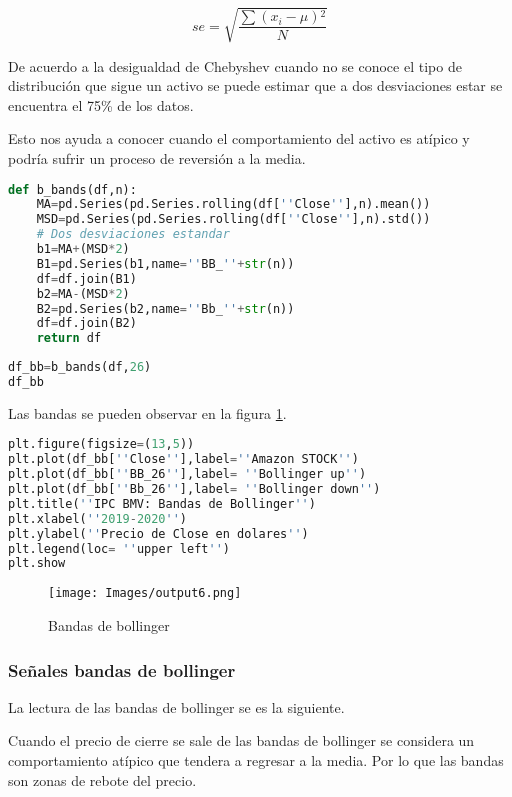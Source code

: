 \documentclass[letterpaper,12pt,oneside]{book}
\begin{document}
\[se=\sqrt{\frac{\sum \left ( x_i-\mu  \right ){^2}}{N}}\]

De acuerdo a la desigualdad de Chebyshev cuando no se conoce el tipo de distribución que sigue un activo se puede estimar que a dos desviaciones estar se encuentra el 75\% de los datos.

Esto nos ayuda a conocer cuando el comportamiento del activo es atípico y podría sufrir un proceso de reversión a la media. 


\begin{lstlisting}[language=Python]
def b_bands(df,n):
    MA=pd.Series(pd.Series.rolling(df[''Close''],n).mean())
    MSD=pd.Series(pd.Series.rolling(df[''Close''],n).std())
    # Dos desviaciones estandar
    b1=MA+(MSD*2)
    B1=pd.Series(b1,name=''BB_''+str(n))
    df=df.join(B1)
    b2=MA-(MSD*2)
    B2=pd.Series(b2,name=''Bb_''+str(n))
    df=df.join(B2)
    return df
\end{lstlisting}



\begin{lstlisting}[language=Python]
df_bb=b_bands(df,26)
df_bb
\end{lstlisting}

Las bandas se pueden observar en la figura \ref{fig:m8}.

\begin{lstlisting}[language=Python]
plt.figure(figsize=(13,5))
plt.plot(df_bb[''Close''],label=''Amazon STOCK'')
plt.plot(df_bb[''BB_26''],label= ''Bollinger up'')
plt.plot(df_bb[''Bb_26''],label= ''Bollinger down'')
plt.title(''IPC BMV: Bandas de Bollinger'')
plt.xlabel(''2019-2020'')
plt.ylabel(''Precio de Close en dolares'')
plt.legend(loc= ''upper left'')
plt.show
\end{lstlisting}

\begin{figure}[ht]
	\centering
	\texttt{[image: Images/output6.png]}
	\caption{Bandas de bollinger}
	\label{fig:m8}
\end{figure}


\subsubsection{Señales bandas de bollinger}

La lectura de las bandas de bollinger se es la siguiente.

Cuando el precio de cierre se sale de las bandas de bollinger se considera un comportamiento atípico que tendera a regresar a la media.
Por lo que las bandas son zonas de rebote del precio.
\end{document}
